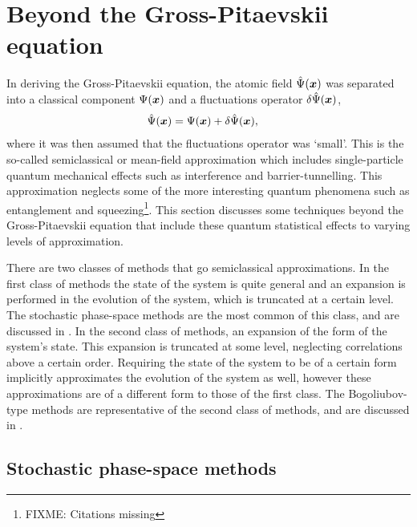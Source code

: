 \section{Beyond the Gross-Pitaevskii equation}
\label{BackgroundTheory:BeyondGrossPitaevskii}

In deriving the Gross-Pitaevskii equation, the atomic field $\hat{\Psi}(\bm{x})$ was separated into a classical component $\Psi(\bm{x})$ and a fluctuations operator $\delta\hat{\Psi}(\bm{x})$,
\begin{align}
    \hat{\Psi}(\bm{x}) &= \Psi(\bm{x}) + \delta\hat{\Psi}(\bm{x}),
\end{align}
where it was then assumed that the fluctuations operator was `small'.  This is the so-called semiclassical or mean-field approximation which includes single-particle quantum mechanical effects such as interference and barrier-tunnelling.  This approximation neglects some of the more interesting quantum phenomena such as entanglement and squeezing\footnote{FIXME: Citations missing}.  This section discusses some techniques beyond the Gross-Pitaevskii equation that include these quantum statistical effects to varying levels of approximation.  

There are two classes of methods that go semiclassical approximations.  In the first class of methods the state of the system is quite general and an expansion is performed in the evolution of the system, which is truncated at a certain level.  The stochastic phase-space methods are the most common of this class, and are discussed in  .  In the second class of methods, an expansion of the form of the system's state.  This expansion is truncated at some level, neglecting correlations above a certain order.  Requiring the state of the system to be of a certain form implicitly approximates the evolution of the system as well, however these approximations are of a different form to those of the first class.  The Bogoliubov-type methods are representative of the second class of methods, and are discussed in .



\subsection{Stochastic phase-space methods}
\label{BackgroundTheory:StochasticPhaseSpaceMethods}

